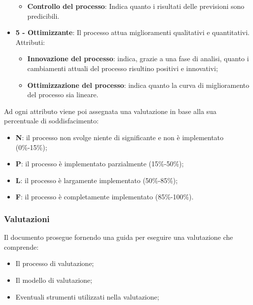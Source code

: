 \documentclass[../piano-di-qualifica.tex]{subfiles}
\begin{document}
\begin{itemize}
\begin{itemize}
            \item \textbf{Controllo del processo}: Indica quanto i risultati delle previsioni sono predicibili.
        \end{itemize}
    \item \textbf{5 - Ottimizzante}: Il processo attua miglioramenti qualitativi e quantitativi.
        \\ Attributi:
        \begin{itemize}
            \item \textbf{Innovazione del processo}: indica, grazie a una fase di analisi, quanto i cambiamenti attuali del processo risultino positivi e innovativi;
            \item \textbf{Ottimizzazione del processo}: indica quanto la curva di miglioramento del processo sia lineare.
        \end{itemize}
\end{itemize}

Ad ogni attributo viene poi assegnata una valutazione in base alla sua percentuale di soddisfacimento:

\begin{itemize}
    \item \textbf{N}: il processo non svolge niente di significante e non è implementato (0\%-15\%);
    \item \textbf{P}: il processo è implementato parzialmente (15\%-50\%);
    \item \textbf{L}: il processo è largamente implementato (50\%-85\%);
    \item \textbf{F}: il processo è completamente implementato (85\%-100\%).
\end{itemize}


\subsubsection{Valutazioni}
\label{sub:valutazioni}
Il documento prosegue fornendo una guida per eseguire una valutazione che comprende:
\begin{itemize}
    \item Il processo di valutazione;
    \item Il modello di valutazione;
    \item Eventuali strumenti utilizzati nella valutazione;
\end{itemize}
\end{document}
